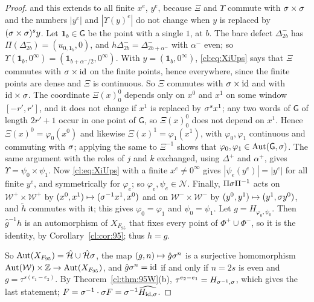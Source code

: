 \begin{proof}
and this extends to all finite $x^e$, $y^e$, because $\Xi$ and $\Upsilon$ commute with $\sigma\times\sigma$ and the numbers $|y^e|$ and $|\Upsilon(y)^e|$ do not change when $y$ is replaced by $(\sigma\times\sigma)^sy$. Let $\mathbf 1_b\in \mathsf G$ be the point with a single $1$, at $b$. The bare defect $\Delta^-_{2b}$ has $\Pi(\Delta^-_{2b})=(u_{0,\mathbf 1_b},0)$, and $h\Delta^-_{2b}=\Delta^-_{2b+\alpha^-}$ with $\alpha^-$ even; so $\Upsilon(\mathbf 1_b,0^\infty)=(\mathbf 1_{b+\alpha^-/2},0^\infty)$. With $y=(\mathbf 1_b,0^\infty)$, \eqref{cl:eq:XiUps} says that $\Xi$ commutes with $\sigma\times\mathrm{id}$ on the finite points, hence everywhere, since the finite points are dense and $\Xi$ is continuous. So $\Xi$ commutes with $\sigma\times\mathrm{id}$ and with $\mathrm{id}\times\sigma$. The coordinate $\Xi(x)^0_0$ depends only on $x^0$ and $x^1$ on some window $[-r',r']$, and it does not change if $x^1$ is replaced by $\sigma^sx^1$; any two words of $\mathsf G$ of length $2r'+1$ occur in one point of $\mathsf G$, so $\Xi(x)^0_0$ does not depend on $x^1$. Hence $\Xi(x)^0=\varphi_0(x^0)$ and likewise $\Xi(x)^1=\varphi_1(x^1)$, with $\varphi_0,\varphi_1$ continuous and commuting with $\sigma$; applying the same to $\Xi^{-1}$ shows that $\varphi_0,\varphi_1\in\operatorname{Aut}(\mathsf G,\sigma)$. The same argument with the roles of $j$ and $k$ exchanged, using $\Delta^+$ and $\alpha^+$, gives $\Upsilon=\psi_0\times\psi_1$. Now \eqref{cl:eq:XiUps} with a finite $x^e\ne0^\infty$ gives $|\psi_e(y^e)|=|y^e|$ for all finite $y^e$, and symmetrically for $\varphi_e$; so $\varphi_e,\psi_e\in\mathcal N$. Finally, $\Pi\sigma\Pi^{-1}$ acts on $\mathcal W^+\times\mathcal W^+$ by $(x^0,x^1)\mapsto(\sigma^{-1}x^1,x^0)$ and on $\mathcal W^-\times\mathcal W^-$ by $(y^0,y^1)\mapsto(y^1,\sigma y^0)$, and $\tilde h$ commutes with it; this gives $\varphi_0=\varphi_1$ and $\psi_0=\psi_1$. Let $g=H_{\varphi_0,\psi_0}$. Then $\hat g^{-1}h$ is an automorphism of $X_{F_{95}}$ that fixes every point of $\Phi^+\cup\Phi^-$, so it is the identity, by Corollary~\ref{cl:cor:95}; thus $h=\hat g$.

So $\operatorname{Aut}(X_{F_{95}})=\hat{\mathcal H}\cup\hat{\mathcal H}\sigma$, the map $(g,n)\mapsto\hat g\sigma^n$ is a surjective homomorphism $\operatorname{Aut}(\mathcal W)\times\mathbb{Z}\to\operatorname{Aut}(X_{F_{95}})$, and $\hat g\sigma^n=\mathrm{id}$ if and only if $n=2s$ is even and $g=\tau^{s(e_1-e_2)}$. By Theorem~\ref{cl:thm:95W}(b), $\tau^{e_2-e_1}=H_{\sigma^{-1},\sigma}$, which gives the last statement; $F=\sigma^{-1}\cdot\sigma F=\sigma^{-1}\widehat{H_{\mathrm{id},\sigma}}$.
\end{proof}

